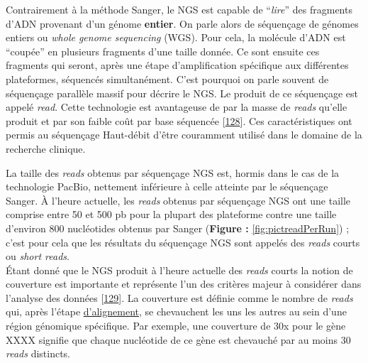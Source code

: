 \documentclass[12pt,a4paper,twoside]{ugathesis}
\theoremstyle{definition}
\theoremstyle{definition}
\theoremstyle{definition}
\theoremstyle{remark}
\begin{document}
Contrairement à la méthode Sanger, le NGS est capable de ``\emph{lire}''
des fragments d'ADN provenant d'un génome \textbf{entier}. On parle
alors de séquençage de génomes entiers ou \emph{whole genome sequencing}
(WGS). Pour cela, la molécule d'ADN est ``coupée'' en plusieurs
fragments d'une taille donnée. Ce sont ensuite ces fragments qui seront,
après une étape d'amplification spécifique aux différentes plateformes,
séquencés simultanément. C'est pourquoi on parle souvent de séquençage
parallèle massif pour décrire le NGS. Le produit de ce séquençage est
appelé \emph{read}. Cette technologie est avantageuse de par la masse de
\emph{reads} qu'elle produit et par son faible coût par base séquencée
{[}\protect\hyperlink{ref-Metzker2010}{128}{]}. Ces caractéristiques ont
permis au séquençage Haut-débit d'être couramment utilisé dans le
domaine de la recherche clinique.

La taille des \emph{reads} obtenus par séquençage NGS est, hormis dans
le cas de la technologie PacBio, nettement inférieure à celle atteinte
par le séquençage Sanger. À l'heure actuelle, les \emph{reads} obtenus
par séquençage NGS ont une taille comprise entre 50 et 500 pb pour la
plupart des plateforme contre une taille d'environ 800 nucléotides
obtenus par Sanger (\textbf{Figure :} \ref{fig:pictreadPerRun}) ; c'est
pour cela que les résultats du séquençage NGS sont appelés des
\emph{reads} courts ou \emph{short reads}.\\
Étant donné que le NGS produit à l'heure actuelle des \emph{reads}
courts la notion de couverture est importante et représente l'un des
critères majeur à considérer dans l'analyse des données
{[}\protect\hyperlink{ref-Sims2014}{129}{]}. La couverture est définie
comme le nombre de \emph{reads} qui, après l'étape
\protect\hyperlink{lalignement}{d'alignement}, se chevauchent les uns
les autres au sein d'une région génomique spécifique. Par exemple, une
couverture de 30x pour le gène XXXX signifie que chaque nucléotide de ce
gène est chevauché par au moins 30 \emph{reads} distincts.

\newpage
\end{document}
